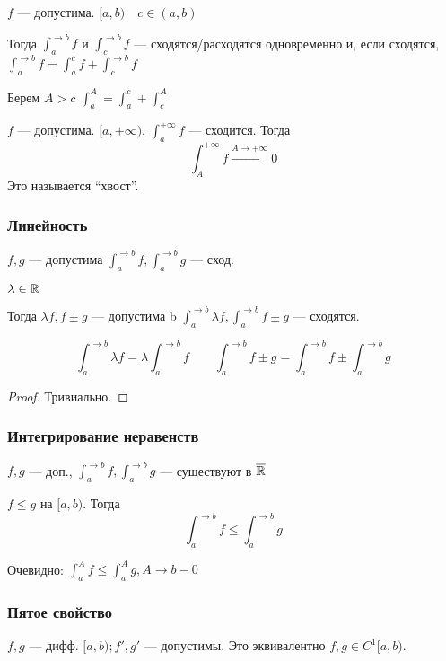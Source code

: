 $f$ --- допустима. $[a, b) \quad c\in (a,b)$

Тогда $\int_a^{\rightarrow b} f$ и $\int_c^{\rightarrow b} f$ --- сходятся/расходятся одновременно и, если сходятся, $\int_a^{\rightarrow b} f = \int_a^c f + \int_c^{\rightarrow b} f$

Берем $A>c$ $\int_a^A = \int_a^c + \int_c^A$

\begin{consequence}
    $f$ --- допустима. $[a, +\infty)$, $\int_a^{+\infty} f$ --- сходится. Тогда
    $$\int_A^{+\infty} f \xrightarrow{A\to+\infty} 0$$
    Это называется ``хвост''.
\end{consequence}

\subsubsection*{Линейность}

$f, g$ --- допустима $\int_a^{\rightarrow b} f, \int_a^{\rightarrow b} g$ --- сход.

$\lambda\in\mathbb{R}$

Тогда $\lambda f, f\pm g$ --- допустима b $\int_a^{\rightarrow b} \lambda f, \int_a^{\rightarrow b} f\pm g$ --- сходятся.

$$\int_a^{\rightarrow b} \lambda f = \lambda \int_a^{\rightarrow b} f \quad\quad \int_a^{\rightarrow b} f\pm g = \int_a^{\rightarrow b} f \pm \int_a^{\rightarrow b} g$$

\begin{proof}
    Тривиально.
\end{proof}

\subsubsection*{Интегрирование неравенств}

$f, g$ --- доп., $\int_a^{\rightarrow b} f, \int_a^{\rightarrow b} g$ --- существуют в $\overline {\mathbb{R}}$

$f\leq g$ на $[a, b)$. Тогда
$$\int_a^{\rightarrow b} f \leq \int_a^{\rightarrow b} g$$

Очевидно: $\int_a^A f\leq \int_a^A g, A\to b-0$

\subsubsection*{Пятое свойство}

$f, g$ --- дифф. $[a, b); f',g'$ --- допустимы. Это эквивалентно $f,g\in C^1[a, b)$.


